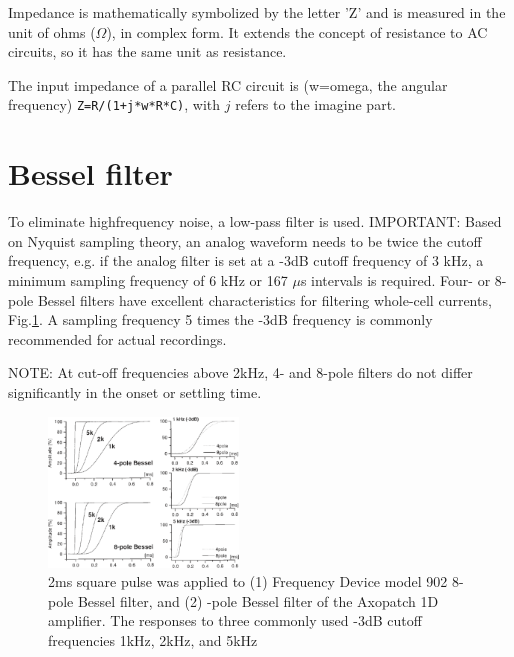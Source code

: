 Impedance is mathematically symbolized by the letter 'Z' and is measured in the
unit of ohms ($\Omega$), in complex form. It extends the concept of resistance
to AC circuits, so it has the same unit as resistance.

The input impedance of a parallel RC circuit is (w=omega, the angular frequency)
\verb!Z=R/(1+j*w*R*C)!, with $j$ refers to the imagine part.

\section{Bessel filter}
\label{sec:Bessel-filter}

To eliminate highfrequency noise, a low-pass filter is used.
IMPORTANT: Based on Nyquist sampling theory, an analog waveform needs to be
twice the cutoff frequency, e.g. if the analog filter is set at a -3dB cutoff
frequency of 3 kHz, a minimum sampling frequency of 6 kHz or 167 $\mu$s
intervals is required. Four- or 8-pole Bessel filters have excellent
characteristics for filtering whole-cell currents, Fig.\ref{fig:filter-Bessels}.
A sampling frequency 5 times the -3dB frequency is commonly recommended for
actual recordings.

NOTE: At cut-off frequencies above 2kHz, 4- and 8-pole filters
do not differ significantly in the onset or settling time.


\begin{figure}[hbt]
  \centerline{\includegraphics[height=4cm,
    angle=0]{./images/filter-Bessels.eps}}
  \caption{2ms square pulse was applied to (1) Frequency Device model 902 8-pole
Bessel filter, and (2) -pole Bessel filter of the Axopatch 1D amplifier. The
responses to three commonly used -3dB cutoff frequencies 1kHz, 2kHz, and 5kHz}
\label{fig:filter-Bessels}
\end{figure}

